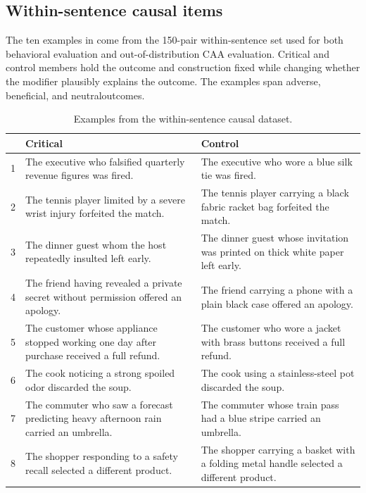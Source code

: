 \subsection{Within-sentence causal items}
\label{app:within-sentence-examples}

The ten examples in  come from the 150-pair within-sentence set used for
both behavioral evaluation and out-of-distribution CAA evaluation. Critical and
control members hold the outcome and construction fixed while changing whether
the modifier plausibly explains the outcome. The examples span adverse,
beneficial, and neutraloutcomes.

\begin{table}[t]
\centering
\footnotesize
\setlength{\tabcolsep}{4pt}
\renewcommand{\arraystretch}{1.08}
\caption{Examples from the within-sentence causal dataset.}
\label{tab:within-sentence-examples}
\begin{tabular}{@{}r >{\raggedright\arraybackslash}p{} >{\raggedright\arraybackslash}p{}@{}}
\toprule
& Critical & Control \\
\midrule
1 & The executive who falsified quarterly revenue figures was fired. & The executive who wore a blue silk tie was fired. \\
2 & The tennis player limited by a severe wrist injury forfeited the match. & The tennis player carrying a black fabric racket bag forfeited the match. \\
3 & The dinner guest whom the host repeatedly insulted left early. & The dinner guest whose invitation was printed on thick white paper left early. \\
4 & The friend having revealed a private secret without permission offered an apology. & The friend carrying a phone with a plain black case offered an apology. \\
5 & The customer whose appliance stopped working one day after purchase received a full refund. & The customer who wore a jacket with brass buttons received a full refund. \\
6 & The cook noticing a strong spoiled odor discarded the soup. & The cook using a stainless-steel pot discarded the soup. \\
7 & The commuter who saw a forecast predicting heavy afternoon rain carried an umbrella. & The commuter whose train pass had a blue stripe carried an umbrella. \\
8 & The shopper responding to a safety recall selected a different product. & The shopper carrying a basket with a folding metal handle selected a different product. \\

\end{tabular}
\end{table}
